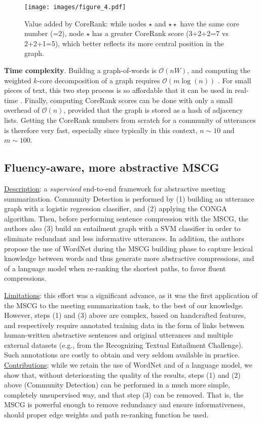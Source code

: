 \documentclass[11pt,a4paper]{article}
\begin{document}
\begin{figure}[t]
\centering
\texttt{[image: images/figure\_4.pdf]}
\captionsetup{size=small}
\caption{Value added by CoreRank: while nodes $\star$ and $\star\star$ have the same core number (=2), node $\star$ has a greater CoreRank score (3+2+2=7 vs 2+2+1=5), which better reflects its more central position in the graph.}
\label{fig:core_rank_illustration}
\end{figure}

\noindent \textbf{Time complexity}. Building a graph-of-words is $\mathcal{O}(nW)$, and computing the weighted $k$-core decomposition of a graph requires $\mathcal{O}(m \log(n))$ \cite{batagelj2002}. For small pieces of text, this two step process is so affordable that it can be used in real-time \cite{meladianos2017real}. Finally, computing CoreRank scores can be done with only a small overhead of $\mathcal{O}(n)$, provided that the graph is stored as a hash of adjacency lists. Getting the CoreRank numbers from scratch for a community of utterances is therefore very fast, especially since typically in this context, $n \sim 10$ and $m \sim 100$.

\subsection{Fluency-aware, more abstractive MSCG \cite{mehdad2013abstractive}}\label{sub:mehdad}
\underline{Description}: a \textit{supervised} end-to-end framework for abstractive meeting summarization. Community Detection is performed by (1) building an utterance graph with a logistic regression classifier, and (2) applying the CONGA algorithm. Then, before performing sentence compression with the MSCG, the authors also (3) build an entailment graph with a SVM classifier in order to eliminate redundant and less informative utterances. In addition, the authors propose the use of WordNet \cite{miller1995wordnet} during the MSCG building phase to capture lexical knowledge between words and thus generate more abstractive compressions, and of a language model when re-ranking the shortest paths, to favor fluent compressions.

\noindent \underline{Limitations}: this effort was a significant advance, as it was the first application of the MSCG to the meeting summarization task, to the best of our knowledge. However, steps (1) and (3) above are complex, based on handcrafted features, and respectively require annotated training data in the form of links between human-written abstractive sentences and original utterances and multiple external datasets (e.g., from the Recognizing Textual Entailment Challenge). Such annotations are costly to obtain and very seldom available in practice.\\
\underline{Contributions}: while we retain the use of WordNet and of a language model, we show that, without deteriorating the quality of the results, steps (1) and (2) above (Community Detection) can be performed in a much more simple, completely unsupervised way, and that step (3) can be removed. That is, the MSCG is powerful enough to remove redundancy and ensure informativeness, should proper edge weights and path re-ranking function be used.\\
\end{document}
